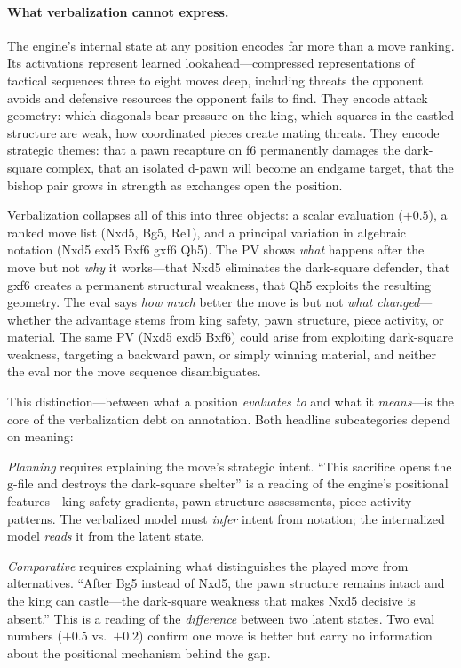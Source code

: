 \paragraph{What verbalization cannot express.}
The engine's internal state at any position encodes far more than a move
ranking.
Its activations represent learned lookahead---compressed representations
of tactical sequences three to eight moves deep, including threats the
opponent avoids and defensive resources the opponent fails to find.
They encode attack geometry: which diagonals bear pressure on the king,
which squares in the castled structure are weak, how coordinated pieces
create mating threats.
They encode strategic themes: that a pawn recapture on f6 permanently
damages the dark-square complex, that an isolated d-pawn will become an
endgame target, that the bishop pair grows in strength as exchanges open
the position.

Verbalization collapses all of this into three objects: a scalar evaluation
($+0.5$), a ranked move list (Nxd5, Bg5, Re1), and a principal variation
in algebraic notation (Nxd5 exd5 Bxf6 gxf6 Qh5).
The PV shows \emph{what} happens after the move but not \emph{why} it
works---that Nxd5 eliminates the dark-square defender, that gxf6 creates
a permanent structural weakness, that Qh5 exploits the resulting geometry.
The eval says \emph{how much} better the move is but not \emph{what
changed}---whether the advantage stems from king safety, pawn structure,
piece activity, or material.
The same PV (Nxd5 exd5 Bxf6) could arise from exploiting dark-square
weakness, targeting a backward pawn, or simply winning material, and
neither the eval nor the move sequence disambiguates.

This distinction---between what a position \emph{evaluates to} and what
it \emph{means}---is the core of the verbalization debt on annotation.
Both headline subcategories depend on meaning:

\emph{Planning} requires explaining the move's strategic intent.
``This sacrifice opens the g-file and destroys the dark-square shelter''
is a reading of the engine's positional features---king-safety gradients,
pawn-structure assessments, piece-activity patterns.
The verbalized model must \emph{infer} intent from notation; the
internalized model \emph{reads} it from the latent state.

\emph{Comparative} requires explaining what distinguishes the played move
from alternatives.
``After Bg5 instead of Nxd5, the pawn structure remains intact and the
king can castle---the dark-square weakness that makes Nxd5 decisive is
absent.''
This is a reading of the \emph{difference} between two latent states.
Two eval numbers ($+0.5$ vs.\ $+0.2$) confirm one move is better but
carry no information about the positional mechanism behind the gap.

